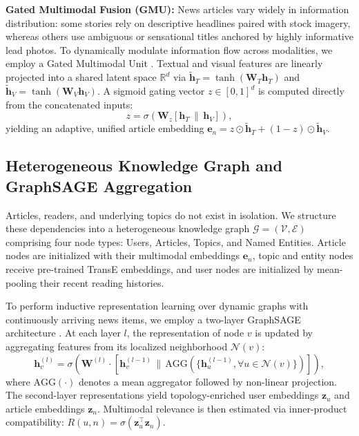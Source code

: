 \documentclass[conference]{IEEEtran}
\begin{document}
\textbf{Gated Multimodal Fusion (GMU):} News articles vary widely in information distribution: some stories rely on descriptive headlines paired with stock imagery, whereas others use ambiguous or sensational titles anchored by highly informative lead photos. To dynamically modulate information flow across modalities, we employ a Gated Multimodal Unit \cite{arevalo_gmu}. Textual and visual features are linearly projected into a shared latent space $\mathbb{R}^d$ via $\tilde{\mathbf{h}}_T = \tanh(\mathbf{W}_T \mathbf{h}_T)$ and $\tilde{\mathbf{h}}_V = \tanh(\mathbf{W}_V \mathbf{h}_V)$. A sigmoid gating vector $z \in [0,1]^d$ is computed directly from the concatenated inputs:
\begin{equation}
z = \sigma\left(\mathbf{W}_z [\mathbf{h}_T \,\|\, \mathbf{h}_V]\right),
\end{equation}
yielding an adaptive, unified article embedding $\mathbf{e}_n = z \odot \tilde{\mathbf{h}}_T + (1 - z) \odot \tilde{\mathbf{h}}_V$.

\subsection{Heterogeneous Knowledge Graph and GraphSAGE Aggregation}
Articles, readers, and underlying topics do not exist in isolation. We structure these dependencies into a heterogeneous knowledge graph $\mathcal{G} = (\mathcal{V}, \mathcal{E})$ comprising four node types: Users, Articles, Topics, and Named Entities. Article nodes are initialized with their multimodal embeddings $\mathbf{e}_n$, topic and entity nodes receive pre-trained TransE embeddings, and user nodes are initialized by mean-pooling their recent reading histories.

To perform inductive representation learning over dynamic graphs with continuously arriving news items, we employ a two-layer GraphSAGE architecture \cite{hamilton_graphsage}. At each layer $l$, the representation of node $v$ is updated by aggregating features from its localized neighborhood $\mathcal{N}(v)$:
\begin{equation}
\mathbf{h}_v^{(l)} = \sigma\left(\mathbf{W}^{(l)} \cdot \left[ \mathbf{h}_v^{(l-1)} \,\|\, \text{AGG}\left(\{\mathbf{h}_u^{(l-1)}, \forall u \in \mathcal{N}(v)\}\right) \right]\right),
\end{equation}
where $\text{AGG}(\cdot)$ denotes a mean aggregator followed by non-linear projection. The second-layer representations yield topology-enriched user embeddings $\mathbf{z}_u$ and article embeddings $\mathbf{z}_n$. Multimodal relevance is then estimated via inner-product compatibility: $R(u,n) = \sigma(\mathbf{z}_u^\top \mathbf{z}_n)$.
\end{document}
